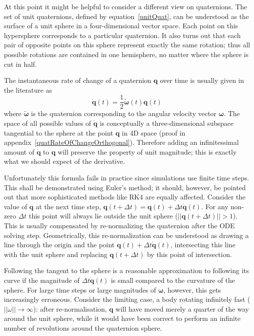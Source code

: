 At this point it might be helpful to consider a different view on quaternions. The set of
unit quaternions, defined by equation~\ref{unitQuat}, can be understood as the surface of
a unit sphere in a four-dimensional vector space. Each point on this hypersphere corresponds
to a particular quaternion. It also turns out that each pair of opposite points on this
sphere represent exactly the same rotation; thus all possible rotations are contained in
one hemisphere, no matter where the sphere is cut in half.

The instantaneous rate of change of a quaternion $\mathbf{q}$ over time is usually given
in the literature as
\begin{equation}
\label{quatRateOfChange}
\dot{\mathbf{q}}(t) = \frac{1}{2}\tilde{\mathbf{\omega}}(t)\mathbf{q}(t)
\end{equation}
where $\tilde{\mathbf{\omega}}$ is the quaternion corresponding to the angular velocity
vector $\mathbf{\omega}$. The space of all possible values of $\dot{\mathbf{q}}$ is
conceptually a three-dimensional subspace tangential to the sphere at the point $\mathbf{q}$
in 4D space (proof in appendix~\ref{quatRateOfChangeOrthogonal}). Therefore adding an
infinitessimal amount of $\dot{\mathbf{q}}$ to $\mathbf{q}$ will preserve the property of
unit magnitude; this is exactly what we should expect of the derivative.

Unfortunately this formula fails in practice since simulations use finite time steps. This
shall be demonstrated using Euler's method; it should, however, be pointed out that more
sophisticated methods like RK4 are equally affected. Consider the value of $\mathbf{q}$ at
the next time step, $\mathbf{q}(t + \Delta t) = \mathbf{q}(t) + \Delta t \dot{\mathbf{q}}(t)$.
For any non-zero $\Delta t$ this point will always lie outside the unit sphere
($||\mathbf{q}(t + \Delta t)|| > 1$). This is usually compensated by re-normalizing the
quaternion after the ODE solving step. Geometrically, this re-normalization can be understood as
drawing a line through the origin and the point $\mathbf{q}(t) + \Delta t \dot{\mathbf{q}}(t)$,
intersecting this line with the unit sphere and replacing $\mathbf{q}(t + \Delta t)$ by this
point of intersection.

Following the tangent to the sphere is a reasonable approximation to following its curve if the
magnitude of $\Delta t \dot{\mathbf{q}}(t)$ is small compared to the curvature of the sphere.
For large time steps or large magnitudes of $\mathbf{\omega}$, however, this gets increasingly
erroneous. Consider the limiting case, a body rotating infinitely fast
($||\omega|| \rightarrow \infty$): after re-normalisation, $\mathbf{q}$ will have moved merely
a quarter of the way around the unit sphere, while it would have been correct to perform an
infinite number of revolutions around the quaternion sphere.

